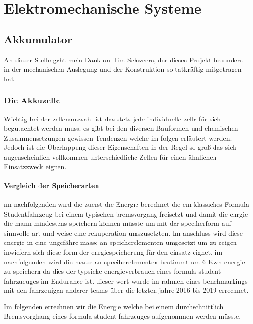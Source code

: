 
\chapter{Elektromechanische Systeme}

\section{Akkumulator}
An dieser Stelle geht mein Dank an Tim Schweers, der dieses Projekt besonders in der mechanischen Auslegung und der Konstruktion so tatkräftig mitgetragen hat.

\subsection{Die Akkuzelle}

Wichtig bei der zellenauswahl ist das stets jede individuelle zelle für sich begutachtet werden muss. es gibt bei den diversen Bauformen und chemischen Zusammensetzungen gewissen Tendenzen welche im folgen erläutert werden. Jedoch ist die Überlappung dieser Eigenschaften in der Regel so groß das sich augenscheinlich vollkommen unterschiedliche Zellen für einen ähnlichen Einsatzzweck eignen.
\FloatBarrier
\subsubsection{Vergleich der Speicherarten}

im nachfolgenden wird die zuerst die Energie berechnet die ein klassiches Formula Studentfahrzeug bei einem typischen bremsvorgang freisetzt und damit die enrgie die mann mindestens speichern können müsste um mit der speciherform auf sinnvolle art und weise eine rekuperation umszusetzten. Im anschluss wird diese energie in eine ungefähre masse an speicherelementen umgesetzt um zu zeigen inwiefern sich diese form der enrgiespeicherung für den einsatz eignet. im nachfolgenden wird die masse an speciherelementen bestimmt um 6 Kwh energie zu speichern da dies der typsiche energieverbrauch eines formula student fahrzueuges im Endurance ist. dieser wert wurde im rahmen eines benchmarkings mit den fahrzeuigen anderer teams über die letzten jahre 2016 bis 2019 errechnet.

Im folgenden errechnen wir die Energie welche bei einem durchschnittlich Bremsvorghang eines formula student fahrzeuges aufgenommen werden müsste. 

